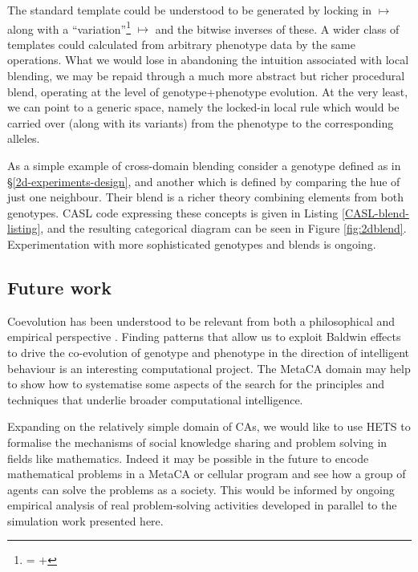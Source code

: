 \documentclass{AISB2008}
\makeatletter
\renewcommand{\boxed}[1]{\text{\fboxsep=.2em\fbox{\m@th$\displaystyle#1$}}}
\newcommand{\mystrut}{\vphantom{b\gamma}}
\makeatother
\begin{document}
The standard template could be understood to be generated by locking in
%
\boxed{0\mystrut}\boxed{0\mystrut}\boxed{0\mystrut} $\mapsto$ \boxed{0\mystrut}
%
along with a ``variation''\footnote{%
%
\boxed{0\mystrut}\boxed{1\mystrut}\boxed{0\mystrut} =
%
\boxed{0\mystrut}\boxed{0\mystrut}\boxed{0\mystrut} +
%
\boxed{\:\:\:\mystrut}\boxed{1\mystrut}\boxed{\:\:\:\mystrut}}
\boxed{0\mystrut}\boxed{1\mystrut}\boxed{0\mystrut} $\mapsto$
\boxed{0\mystrut} and the bitwise inverses of these.  A wider class of
templates could calculated from arbitrary phenotype data by the same
operations.  What we would lose in abandoning the intuition associated
with local blending, we may be repaid through a much more abstract
but richer procedural blend, operating at the level of
genotype+phenotype evolution.  At the very least, we can point to a
generic space, namely the locked-in local rule which would be carried
over (along with its variants) from the phenotype to the corresponding
alleles.

As a simple example of cross-domain blending consider a genotype
defined as in \S\ref{2d-experiments-design}, and another which is
defined by comparing the hue of just one neighbour.  Their blend is a
richer theory combining elements from both genotypes.  CASL code
expressing these concepts is given in Listing
\ref{CASL-blend-listing}, and the resulting categorical diagram can be
seen in Figure \ref{fig:2dblend}.  Experimentation with more
sophisticated genotypes and blends is ongoing.

\subsection{Future work}

Coevolution has been understood to be relevant from both a
philosophical \cite{mead1932philosophy} and empirical perspective
\cite{van1973new}.  Finding patterns that allow us to exploit Baldwin
effects to drive the co-evolution of genotype and phenotype in the
direction of intelligent behaviour is an interesting computational
project.  The MetaCA domain may help to show how to systematise some
aspects of the search for the principles and techniques that underlie
broader computational intelligence.

Expanding on the relatively simple domain of CAs, we would like to use
HETS to formalise the mechanisms of social knowledge sharing and
problem solving in fields like mathematics.  Indeed it may be possible
in the future to encode mathematical problems in a MetaCA or cellular
program and see how a group of agents can solve the problems as a
society.  This would be informed by ongoing empirical analysis of real
problem-solving activities \cite{eca} developed in parallel to the
simulation work presented here.
\end{document}
